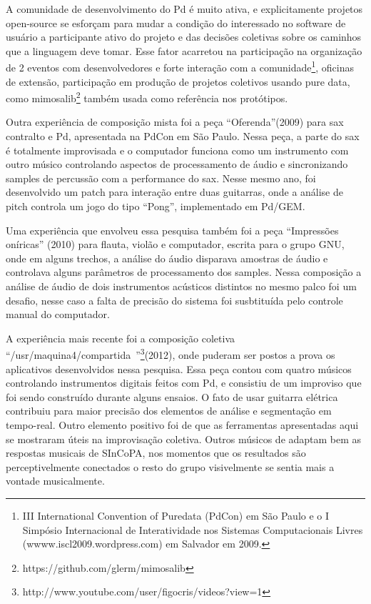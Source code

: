 \documentclass{ppgmus}
\begin{document}
A comunidade de desenvolvimento do Pd é muito ativa, e explicitamente projetos open-source
se esforçam para mudar a condição do interessado no software de usuário a participante ativo do projeto
e das decisões coletivas sobre os caminhos que a linguagem deve tomar. Esse  fator acarretou na participação na
organização de 2 eventos com desenvolvedores e forte interação com a comunidade\footnote{III International
Convention of Puredata (PdCon) em São Paulo e o I Simpósio Internacional de Interatividade nos Sistemas
Computacionais Livres (wwww.iscl2009.wordpress.com) em Salvador em 2009.}, oficinas de extensão, 
participação em produção de projetos coletivos usando pure data, como mimosalib\footnote
{https://github.com/glerm/mimosalib} também usada como referência nos protótipos.

Outra experiência de composição mista foi a peça ``Oferenda''(2009) para sax contralto e Pd, 
apresentada na PdCon em São Paulo. Nessa peça, a parte do sax é totalmente improvisada e 
o computador funciona como um instrumento com outro músico controlando aspectos de 
processamento de áudio e sincronizando samples de percussão com a performance do sax. 
Nesse mesmo ano, foi desenvolvido um patch para interação entre duas guitarras, onde a
análise de pitch controla um jogo do tipo ``Pong'', implementado em Pd/GEM. 

Uma experiência que envolveu essa pesquisa também foi a peça ``Impressões oníricas'' (2010) para flauta,
violão e computador, escrita para o grupo GNU, onde em alguns trechos, a análise do áudio
disparava amostras de áudio e controlava alguns parâmetros de processamento dos samples. 
Nessa composição a análise de áudio de dois instrumentos acústicos distintos no mesmo palco foi 
um desafio, nesse caso a falta de precisão do sistema foi susbtituída pelo controle manual
do computador.

A experiência mais recente foi a composição coletiva ``/usr/maquina4/compartida~''\footnote
{http://www.youtube.com/user/figocris/videos?view=1}(2012), onde puderam
ser postos a prova os aplicativos desenvolvidos nessa pesquisa. Essa peça contou com quatro
músicos controlando instrumentos digitais feitos com Pd, e consistiu de um improviso que foi
sendo construído durante alguns ensaios. O fato de usar guitarra elétrica
contribuiu para maior precisão dos elementos de análise e segmentação em tempo-real.
Outro elemento positivo foi de que as ferramentas apresentadas aqui se mostraram úteis na 
improvisação coletiva. Outros músicos de adaptam bem as respostas musicais de SInCoPA, nos momentos que 
os resultados são perceptivelmente conectados o resto do grupo visivelmente se sentia mais
a vontade musicalmente.
\end{document}
